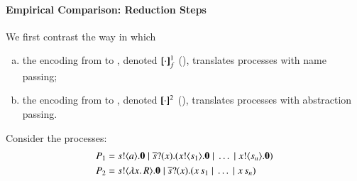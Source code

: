\documentclass[preprint,11pt]{elsarticle}
\begin{document}
{\paragraph{Empirical Comparison: Reduction Steps}
We first contrast the way in which 
\begin{enumerate}[a)]
\item 
the encoding from \HOp to \HO, denoted $[\!\![\cdot]\!\!]^1_f$ (), translates processes with name passing;
\item 
the encoding from \HOp to \sessp, denoted $[\!\![\cdot]\!\!]^2$ (), translates processes with abstraction passing.
\end{enumerate}
Consider the \HOp processes:
\begin{align*}
P_1 & =  s ! \langle a \rangle . \mathbf{0} \;|\; \overline{s} ? (x) . (x ! \langle s_1 \rangle . \mathbf{0} \;|\; \dots \;|\; x ! \langle s_n \rangle . \mathbf{0}) 
\\
P_2 & =  s ! \langle \lambda x.\,R \rangle . \mathbf{0} \;|\; \overline{s} ? (x) . (x\, {s_1} \;|\; \dots \;|\; x\, {s_n})
\end{align*}

}
\end{document}
